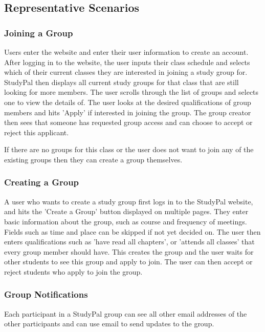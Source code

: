 \documentclass[conference]{IEEEtran}
\begin{document}
\subsection{Representative Scenarios}

\subsubsection{Joining a Group}
Users enter the website and enter their user information to create an account.
After logging in to the website, the user inputs their class schedule and selects which of their current classes they are interested in joining a study group for.
StudyPal then displays all current study groups for that class that are still looking for more members.
The user scrolls through the list of groups and selects one to view the details of.
The user looks at the desired qualifications of group members and hits 'Apply' if interested in joining the group.
The group creator then sees that someone has requested group access and can choose to accept or reject this applicant.

If there are no groups for this class or the user does not want to join any of the existing groups then they can create a group themselves.

\subsubsection{Creating a Group}
A user who wants to create a study group first logs in to the StudyPal website, and hits the 'Create a Group' button displayed on multiple pages.
They enter basic information about the group, such as course and frequency of meetings.
Fields such as time and place can be skipped if not yet decided on.
The user then enters qualifications such as 'have read all chapters', or 'attends all classes' that every group member should have.
This creates the group and the user waits for other students to see this group and apply to join.
The user can then accept or reject students who apply to join the group.

\subsubsection{Group Notifications}
Each participant in a StudyPal group can see all other email addresses of the other participants and can use email to send updates to the group.
\end{document}
